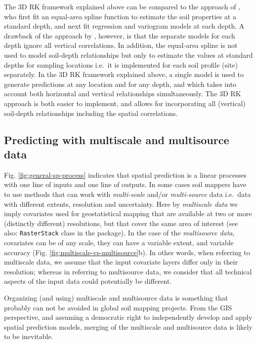 \documentclass[graybox,natbib,nospthms,UStrade]{svmono}
\begin{document}
The 3D RK framework explained above can be compared to the approach of
\citet{Malone2009Geoderma}, who first fit an equal-area spline function to
estimate the soil properties at a standard depth, and next fit
regression and variogram models at each depth. A drawback of the
approach by \citet{Malone2009Geoderma}, however, is that the separate models
for each depth ignore all vertical correlations. In addition, the
equal-area spline is not used to model soil-depth relationships but only
to estimate the values at standard depths for sampling locations i.e.~it
is implemented for each soil profile (site) separately. In the 3D RK
framework explained above, a single model is used to generate
predictions at any location and for any depth, and which takes into
account both horizontal and vertical relationships simultaneously. The
3D RK approach is both easier to implement, and allows for incorporating
all (vertical) soil-depth relationships including the spatial
correlations.

\hypertarget{multiscale}{%
\subsection{Predicting with multiscale and multisource data}\label{multiscale}}

Fig. \ref{fig:general-sp-process} indicates that spatial prediction is a
linear processes with one line of inputs and one line of outputs. In
some cases soil mappers have to use methods that can work with
\emph{multi-scale} and/or \emph{multi-source} data i.e.~data with different
extents, resolution and uncertainty. Here by \emph{multiscale data} we imply
covariates used for geostatistical mapping that are available at two or
more (distinctly different) resolutions, but that cover the same area of
interest (see also: \texttt{RasterStack} class in the package). In the case of
the \emph{multisource data}, covariates can be of any scale, they can have a
variable extent, and variable accuracy
(Fig. \ref{fig:multiscale-vs-multisource}b). In other words, when
referring to multiscale data, we assume that the input covariate layers
differ only in their resolution; whereas in referring to multisource data, we
consider that all technical aspects of the input data could potentially be
different.

Organizing (and using) multiscale and multisource data is something that
probably can not be avoided in global soil mapping projects. From the
GIS perspective, and assuming a democratic right to independently
develop and apply spatial prediction models, merging of the multiscale
and multisource data is likely to be inevitable.
\end{document}
